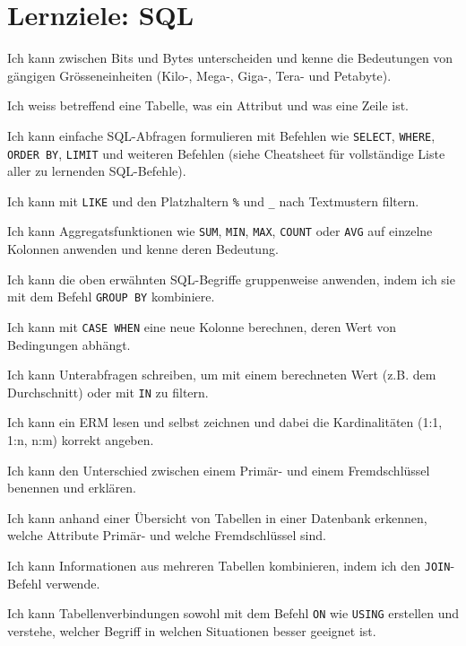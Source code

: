 \section*{Lernziele: SQL}
\begin{todolist}
\item Ich kann zwischen Bits und Bytes unterscheiden und kenne die Bedeutungen von gängigen Grösseneinheiten (Kilo-, Mega-, Giga-, Tera- und Petabyte).
\item Ich weiss betreffend eine Tabelle, was ein Attribut und was eine Zeile ist.
\item Ich kann einfache SQL-Abfragen formulieren mit Befehlen wie \lstinline|SELECT|, \lstinline|WHERE|,  \lstinline|ORDER BY|, \lstinline|LIMIT| und weiteren Befehlen (siehe Cheatsheet für vollständige Liste aller zu lernenden SQL-Befehle).
\item Ich kann mit \lstinline|LIKE| und den Platzhaltern \lstinline|%| und \lstinline|_| nach Textmustern filtern.
\item Ich kann Aggregatsfunktionen wie \lstinline|SUM|, \lstinline|MIN|, \lstinline|MAX|, \lstinline|COUNT| oder \lstinline|AVG| auf einzelne Kolonnen anwenden und kenne deren Bedeutung.
\item Ich kann die oben erwähnten SQL-Begriffe gruppenweise anwenden, indem ich sie mit dem Befehl \lstinline|GROUP BY| kombiniere.
\item Ich kann mit \lstinline|CASE WHEN| eine neue Kolonne berechnen, deren Wert von Bedingungen abhängt.
\item Ich kann Unterabfragen schreiben, um mit einem berechneten Wert (z.B. dem Durchschnitt) oder mit \lstinline|IN| zu filtern.
\item Ich kann ein \gls{ERM} lesen und selbst zeichnen und dabei die Kardinalitäten (1:1, 1:n, n:m) korrekt angeben.
\item Ich kann den Unterschied zwischen einem Primär- und einem Fremdschlüssel benennen und erklären.
\item Ich kann anhand einer Übersicht von Tabellen in einer Datenbank erkennen, welche Attribute Primär- und welche Fremdschlüssel sind.
\item Ich kann Informationen aus mehreren Tabellen kombinieren, indem ich den \lstinline|JOIN|-Befehl verwende.
\item Ich kann Tabellenverbindungen sowohl mit dem Befehl \lstinline|ON| wie \lstinline|USING| erstellen und verstehe, welcher Begriff in welchen Situationen besser geeignet ist.

\end{todolist}
